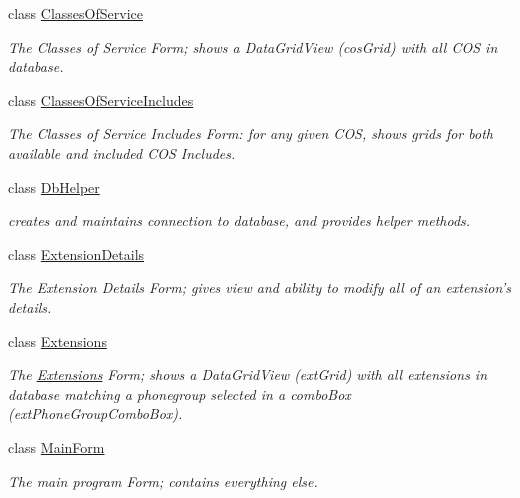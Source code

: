 \begin{DoxyCompactItemize}
\item 
class \hyperlink{class_ias_pbx_config_1_1_classes_of_service}{ClassesOfService}
\begin{DoxyCompactList}\small\item\em The Classes of Service Form; shows a DataGridView (cosGrid) with all COS in database. \item\end{DoxyCompactList}\item 
class \hyperlink{class_ias_pbx_config_1_1_classes_of_service_includes}{ClassesOfServiceIncludes}
\begin{DoxyCompactList}\small\item\em The Classes of Service Includes Form: for any given COS, shows grids for both available and included COS Includes. \item\end{DoxyCompactList}\item 
class \hyperlink{class_ias_pbx_config_1_1_db_helper}{DbHelper}
\begin{DoxyCompactList}\small\item\em creates and maintains connection to database, and provides helper methods. \item\end{DoxyCompactList}\item 
class \hyperlink{class_ias_pbx_config_1_1_extension_details}{ExtensionDetails}
\begin{DoxyCompactList}\small\item\em The Extension Details Form; gives view and ability to modify all of an extension's details. \item\end{DoxyCompactList}\item 
class \hyperlink{class_ias_pbx_config_1_1_extensions}{Extensions}
\begin{DoxyCompactList}\small\item\em The \hyperlink{class_ias_pbx_config_1_1_extensions}{Extensions} Form; shows a DataGridView (extGrid) with all extensions in database matching a phonegroup selected in a comboBox (extPhoneGroupComboBox). \item\end{DoxyCompactList}\item 
class \hyperlink{class_ias_pbx_config_1_1_main_form}{MainForm}
\begin{DoxyCompactList}\small\item\em The main program Form; contains everything else. \item\end{DoxyCompactList}\item 

\end{DoxyCompactItemize}
